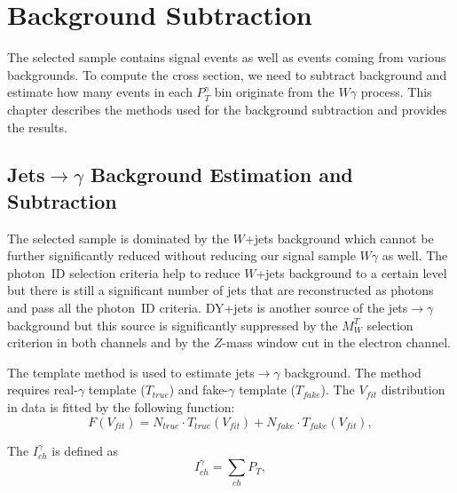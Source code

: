 \section{Background Subtraction}
\label{sec:BackgroundSubtraction}

The selected sample contains signal events as well as events coming from various backgrounds. To compute the cross section, we need to subtract background and estimate how many events in each $P_T^\gamma$ bin originate from the $W\gamma$ process. This chapter describes the methods used for the background subtraction and provides the results.

\subsection{Jets$\rightarrow\gamma$ Background Estimation and Subtraction}
\label{sec:BackgroundSubtraction_jtog}

The selected sample is dominated by the $W$+jets background which cannot be further significantly reduced without reducing our signal sample $W\gamma$ as well. The photon~ID selection criteria help to reduce $W$+jets background to a certain level but there is still a significant number of jets that are reconstructed as photons and pass all the photon~ID criteria. DY+jets is another source of the jets$\rightarrow \gamma$ background but this source is significantly suppressed by the $M_W^T$ selection criterion in both channels and by the $Z$-mass window cut in the electron channel.

The template method is used to estimate jets$ \rightarrow \gamma$ background. The method requires real-$\gamma$ template ($T_{true}$) and fake-$\gamma$ template ($T_{fake}$). The $V_{fit}$ distribution in data is fitted by the following function: 
\begin{equation}
F(V_{fit})=N_{true} \cdot T_{true}(V_{fit}) + N_{fake} \cdot T_{fake}(V_{fit}),
\end{equation}

The $I_{ch}^{\gamma}$ is defined as
\begin{equation}
  I_{ch}^{\gamma} = \sum_{ch} P_T,
\end{equation} 

